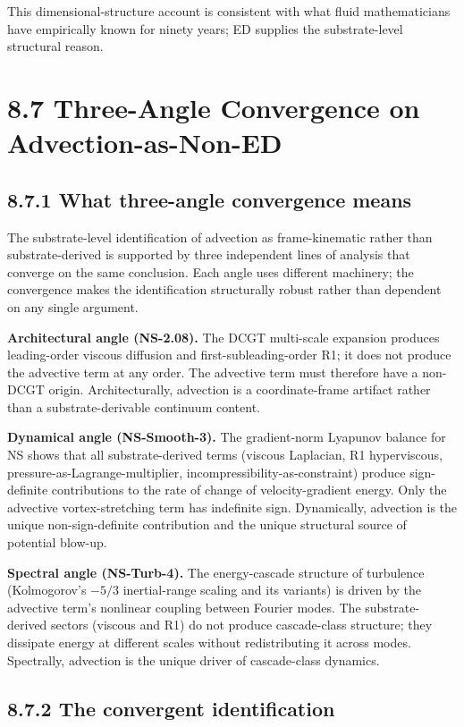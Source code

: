 \documentclass[11pt]{book}
\begin{document}
This dimensional-structure account is consistent with what fluid mathematicians have empirically known for ninety years; ED supplies the substrate-level structural reason.

\section{8.7 Three-Angle Convergence on Advection-as-Non-ED}

\subsection{8.7.1 What three-angle convergence means}

The substrate-level identification of advection as frame-kinematic rather than substrate-derived is supported by three independent lines of analysis that converge on the same conclusion. Each angle uses different machinery; the convergence makes the identification structurally robust rather than dependent on any single argument.

\textbf{Architectural angle (NS-2.08).} The DCGT multi-scale expansion produces leading-order viscous diffusion and first-subleading-order R1; it does not produce the advective term at any order. The advective term must therefore have a non-DCGT origin. Architecturally, advection is a coordinate-frame artifact rather than a substrate-derivable continuum content.

\textbf{Dynamical angle (NS-Smooth-3).} The gradient-norm Lyapunov balance for NS shows that all substrate-derived terms (viscous Laplacian, R1 hyperviscous, pressure-as-Lagrange-multiplier, incompressibility-as-constraint) produce sign-definite contributions to the rate of change of velocity-gradient energy. Only the advective vortex-stretching term has indefinite sign. Dynamically, advection is the unique non-sign-definite contribution and the unique structural source of potential blow-up.

\textbf{Spectral angle (NS-Turb-4).} The energy-cascade structure of turbulence (Kolmogorov's $-5/3$ inertial-range scaling and its variants) is driven by the advective term's nonlinear coupling between Fourier modes. The substrate-derived sectors (viscous and R1) do not produce cascade-class structure; they dissipate energy at different scales without redistributing it across modes. Spectrally, advection is the unique driver of cascade-class dynamics.

\subsection{8.7.2 The convergent identification}
\end{document}
